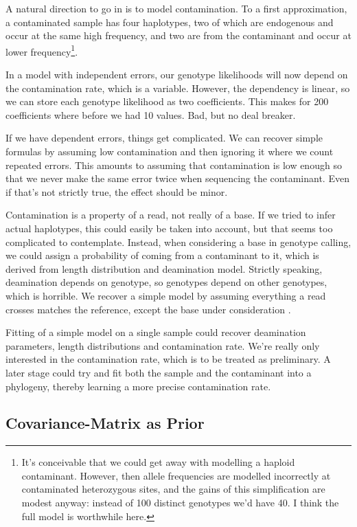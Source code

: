 \documentclass{article}
\begin{document}
A natural direction to go in is to model contamination.  To a first
approximation, a contaminated sample has four haplotypes, two of which
are endogenous and occur at the same high frequency, and two are from
the contaminant and occur at lower frequency\footnote{It's conceivable
that we could get away with modelling a haploid contaminant.  However,
then allele frequencies are modelled incorrectly at contaminated
heterozygous sites, and the gains of this simplification are modest
anyway:  instead of 100 distinct genotypes we'd have 40.  I think the
full model is worthwhile here.}.

In a model with independent errors, our genotype likelihoods will now
depend on the contamination rate, which is a variable.  However, the
dependency is linear, so we can store each genotype
likelihood as two coefficients.  This makes for 200 coefficients where
before we had 10 values.  Bad, but no deal breaker.

If we have dependent errors, things get complicated.  We can recover
simple formulas by assuming low contamination and then ignoring it where
we count repeated errors.  This amounts to assuming that contamination
is low enough so that we never make the same error twice when sequencing
the contaminant.  Even if that's not strictly true, the effect should be
minor.

Contamination is a property of a read, not really of a base.  If we
tried to infer actual haplotypes, this could easily be taken into
account, but that seems too complicated to contemplate.  Instead, when
considering a base in genotype calling, we could assign a probability of
coming from a contaminant to it, which is derived from length
distribution and deamination model.  Strictly speaking, deamination
depends on genotype, so genotypes depend on other genotypes, which is
horrible.  We recover a simple model by assuming everything a read
crosses matches the reference, except the base under consideration
.

Fitting of a simple model on a single sample could recover deamination
parameters, length distributions and contamination rate.  We're really
only interested in the contamination rate, which is to be treated as
preliminary.  A later stage could try and fit both the sample and the
contaminant into a phylogeny, thereby learning a more precise
contamination rate.

\subsection{Covariance-Matrix as Prior}
\end{document}
